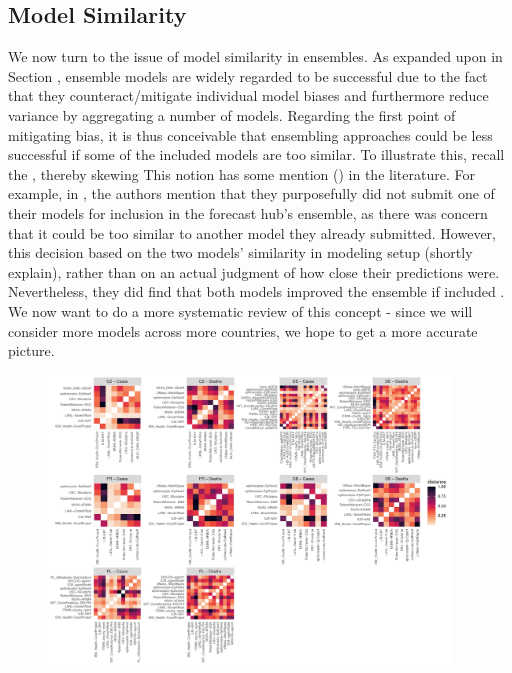 \subsection{Model Similarity}
We now turn to the issue of model similarity in ensembles. As expanded upon in Section , ensemble models are widely regarded to be successful due to the fact that they counteract/mitigate individual model biases and furthermore reduce variance by aggregating a number of models. Regarding the first point of mitigating bias, it is thus conceivable that ensembling approaches could be less successful if some of the included models are too similar. To illustrate this, recall the , thereby skewing 
This notion has some mention () in the literature. For example, in \cite{bosse_comparing_2021}, the authors mention that they purposefully did not submit one of their models for inclusion in the forecast hub's ensemble, as there was concern that it could be too similar to another model they already submitted. However, this decision based on the two models' similarity in modeling setup (shortly explain), rather than on an actual judgment of how close their predictions were. Nevertheless, they did find that both models improved the ensemble if included . We now want to do a more systematic review of this concept - since we will consider more models across more countries, we hope to get a more accurate picture.\\
\begin{figure}
\centering
\includegraphics[width = 0.95\textwidth]{../plots/model_similarity.pdf}
\end{figure}
\newpage
